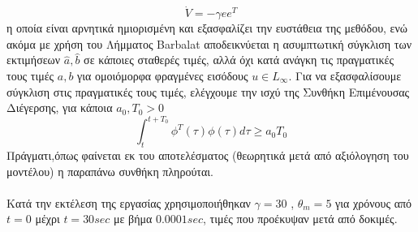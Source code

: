 \documentclass[12pt]{article}
\begin{document}
\[\dot{V} = -\gamma e e^T \]
η οποία είναι αρνητικά ημιορισμένη και εξασφαλίζει την ευστάθεια της μεθόδου, ενώ ακόμα με χρήση του Λήμματος Barbalat αποδεικνύεται η ασυμπτωτική σύγκλιση των εκτιμήσεων $\hat{a},\hat{b}$ σε κάποιες σταθερές τιμές, αλλά όχι κατά ανάγκη τις πραγματικές τους τιμές $a,b$ για ομοιόμορφα φραγμένες εισόδους $u \in L_{\infty}$. Για να εξασφαλίσουμε σύγκλιση στις πραγματικές τους τιμές, ελέγχουμε την ισχύ της Συνθήκη Επιμένουσας Διέγερσης, για κάποια $a_0,T_0 > 0 $
\[ \int_{t}^{t+T_0} \phi^T(\tau) \phi(\tau) d\tau \geq a_0T_0 \]
Πράγματι,όπως φαίνεται εκ του αποτελέσματος (θεωρητικά μετά από αξιόλογηση του μοντέλου) η παραπάνω συνθήκη πληρούται.
\\ \\
Κατά την εκτέλεση της εργασίας χρησιμοποιήθηκαν $\gamma=30$ , $\theta_m=5$ για χρόνους από $t=0$ μέχρι $t=30 sec$ με βήμα $0.0001 sec$, τιμές που προέκυψαν μετά από δοκιμές.
\end{document}
